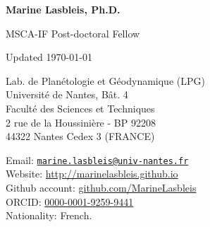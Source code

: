 \documentclass{cv}
\author{Marine Lasbleis}
\begin{document}
\begin{minipage}{0.6\textwidth}
{\Large{\textbf{Marine Lasbleis, Ph.D.}

MSCA-IF Post-doctoral Fellow}}
\end{minipage}
\hfill
\begin{minipage}{0.38\textwidth}
\begin{flushright}
Updated \today
\end{flushright}
\end{minipage}
\vspace{0.4cm}

\begin{minipage}{0.5\linewidth}
Lab. de Plan\'etologie et G\'eodynamique 
(LPG)\\
Universit\'e de Nantes, B\^at. 4\\
Facult\'e des Sciences et Techniques\\
  2 rue de la Houssini\`ere - BP 92208\\
  44322 Nantes Cedex 3 (FRANCE)
\end{minipage}
\hfill
  \begin{minipage}{0.45\linewidth}
	Email: \texttt{\href{mailto:marine.lasbleis@univ-nantes.fr}{marine.lasbleis@univ-nantes.fr}}\\
	Website:  \href{http://marinelasbleis.github.io}{http://marinelasbleis.github.io}\\
	Github account: \href{https://github.com/MarineLasbleis}{github.com/MarineLasbleis}\\
	ORCID: \href{http://orcid.org/0000-0001-9259-9441}{0000-0001-9259-9441}\\
	Nationality: French.
\end{minipage}


\vspace{0.5cm}




\end{document}
